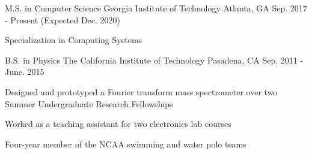 

\begin{cventries}

  \cventry
    {M.S. in Computer Science}
    {Georgia Institute of Technology}
    {Atlanta, GA}
    {Sep. 2017 - Present (Expected Dec. 2020)}
    {
      \begin{cvitems}
        \item {Specialization in Computing Systems}
      \end{cvitems}
    }

  \cventry
    {B.S. in Physics} %
    {The California Institute of Technology} %
    {Pasadena, CA} %
    {Sep. 2011 - June. 2015} %
    {
      \begin{cvitems}
        \item{Designed and prototyped a Fourier transform mass spectrometer over two Summer Undergraduate Research Fellowships}
        \item{Worked as a teaching assistant for two electronics lab courses}
        \item{Four-year member of the NCAA swimming and water polo teams}
      \end{cvitems}
    }



\end{cventries}

